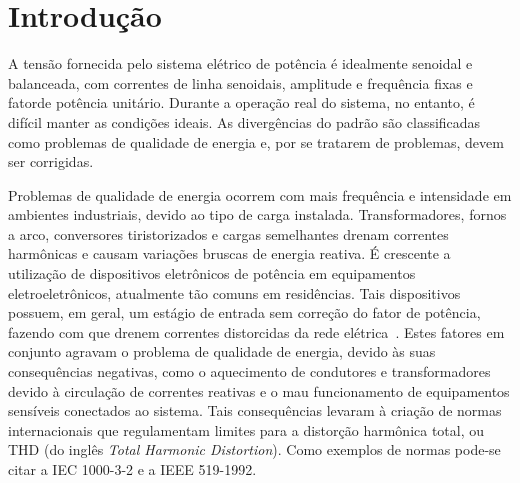 
\chapter{Introdução}\label{introducao}


	A tensão fornecida pelo sistema elétrico de potência é idealmente senoidal e
	balanceada, com correntes de linha senoidais, amplitude e frequência fixas e
	fatorde potência unitário. Durante a operação real do sistema, no entanto,
	é difícil manter as condições ideais. As divergências do padrão são classificadas
	como problemas de qualidade de energia e, por se tratarem de problemas, devem
	ser corrigidas.

	Problemas de qualidade de energia ocorrem com mais frequência e intensidade em
	ambientes industriais, devido ao tipo de carga instalada. Transformadores,
	fornos a arco, conversores tiristorizados e cargas semelhantes drenam correntes
	harmônicas e causam variações bruscas de energia reativa. É crescente a
	utilização de dispositivos eletrônicos de potência em equipamentos
	eletroeletrônicos, atualmente tão comuns em residências. Tais dispositivos possuem,
	em geral, um estágio de entrada sem correção do fator de potência, fazendo com que
	drenem correntes distorcidas da rede elétrica~\cite{ref:MANSOOR}. Estes fatores em
	conjunto agravam o problema de qualidade de energia, devido às suas consequências
	negativas, como	o aquecimento de condutores e transformadores devido à circulação
	de correntes reativas e o mau funcionamento de equipamentos sensíveis conectados
	ao sistema.	Tais consequências levaram à criação de normas internacionais que
	regulamentam limites para a distorção harmônica total, ou THD (do inglês \emph{
	Total Harmonic Distortion}). Como exemplos de normas pode-se citar a IEC 1000-3-2
	e a IEEE 519-1992.


